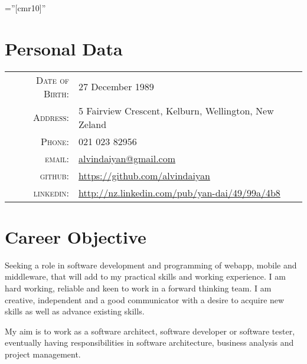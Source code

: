 \documentclass[a4paper,10pt]{article} %
\begin{document}
\pagestyle{empty} %

\font\fb=''[cmr10]'' %


\par{\bigskip\par} %

\section{Personal Data}

\begin{tabular}{rl}
\textsc{Date of Birth:} & 27 December 1989 \\
\textsc{Address:} & 5 Fairview Crescent, Kelburn, Wellington, New Zeland \\
\textsc{Phone:} & 021 023 82956\\
\textsc{email:} & \href{mailto:alvindaiyan@gmail.com}{alvindaiyan@gmail.com} \\
\textsc{github:} & \href{https://github.com/alvindaiyan}{https://github.com/alvindaiyan}\\
\textsc{linkedin:} & \href{http://nz.linkedin.com/pub/yan-dai/49/99a/4b8}{http://nz.linkedin.com/pub/yan-dai/49/99a/4b8}
\end{tabular}




\section{Career Objective}

Seeking a role in software development and programming of webapp, mobile and middleware, that will add to my practical skills and working experience. I am hard working, reliable and keen to work in a forward thinking team. I am creative, independent and a good communicator with a desire to acquire new skills as well as advance existing skills.

My aim is to work as a software architect, software developer or software tester, eventually having responsibilities in software architecture, business analysis and project management.
\end{document}
